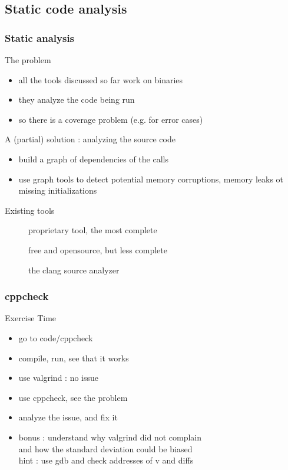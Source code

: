 \subsection[static]{Static code analysis}

\begin{frame}[fragile]
  \frametitle{Static analysis}
  \begin{alertblock}{The problem}
    \begin{itemize}
    \item all the tools discussed so far work on binaries
    \item they analyze the code being run
    \item so there is a coverage problem (e.g. for error cases)
    \end{itemize}
  \end{alertblock}
  \pause
  \begin{block}{A (partial) solution : analyzing the source code}
    \begin{itemize}
    \item build a graph of dependencies of the calls
    \item use graph tools to detect potential memory corruptions,
      memory leaks ot missing initializations
    \end{itemize}
  \end{block}
  \pause
  \begin{block}{Existing tools}
    \begin{description}
    \item[\href{http://www.coverity.com/}{}]
      proprietary tool, the most complete
    \item[\href{http://cppcheck.sourceforge.net/}{}]
      free and opensource, but less complete
    \item[\href{http://clang-analyzer.llvm.org/}{}]
      the clang source analyzer
    \end{description}
  \end{block}
\end{frame}

\begin{frame}[fragile]
  \frametitle{cppcheck}
  \begin{alertblock}{Exercise Time}
    \begin{itemize}
    \item go to code/cppcheck
    \item compile, run, see that it works
    \item use valgrind : no issue
    \item use cppcheck, see the problem
    \item analyze the issue, and fix it
    \item bonus : understand why valgrind did not complain \\
      and how the standard deviation could be biased \\
      hint : use gdb and check addresses of v and diffs
    \end{itemize}
  \end{alertblock}
\end{frame}
